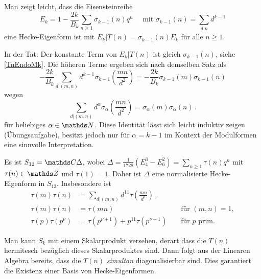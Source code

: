\begin{beme-list}
\item Man zeigt \glqq{}leicht\grqq{}, dass die Eisensteinreihe \[
E_k = 1 - \frac{2k}{B_k} \sum_{n \geq 1} \sigma_{k-1} (n) q^n \quad \text{ mit } \sigma_{k-1} (n) = \sum_{d \vert n} d^{k-1}
\]
eine Hecke-Eigenform ist mit $E_k | T(n) = \sigma_{k-1}(n) E_k$ für alle $n \geq 1$.

In der Tat: Der konstante Term von $E_k | T(n)$ ist gleich $\sigma_{k-1}(n)$, siehe \autoref{TnEndoMk}. Die höheren Terme ergeben sich nach demselben Satz als 
\[
- \frac{2k}{B_k} \sum_{d \vert (m,n)} d^{k-1} \sigma_{k-1} \left(\frac{mn}{d^2}\right) = - \frac{2k}{B_k} \sigma_{k-1}(m) \sigma_{k-1}(n)
\]
wegen
\[
\sum_{d \vert (m,n)} d^\alpha \sigma_\alpha \left(\frac{mn}{d^2}\right) = \sigma_\alpha(m) \sigma_\alpha(n)
\,.
\]
für beliebiges $\alpha \in \NN$. Diese Identität lässt sich leicht induktiv zeigen (Übungsaufgabe), besitzt jedoch nur für $\alpha = k - 1$ im Kontext der Modulformen eine sinnvolle Interpretation.
\item Es ist $S_{12} = \CC \Delta$, wobei $\Delta = \frac {1}{1728} (E_4^3 - E_6^2) = \sum_{n \geq 1} \tau(n) q^n$ mit $\tau (n) \in \ZZ$ und $\tau(1) = 1$. Daher ist $\Delta$ eine normalisierte Hecke-Eigenform in $S_{12}$. Insbesondere ist
\begin{align*}
\tau(m) \tau(n) &= \sum_{d \vert (m,n)} d^{11} \tau \left( \frac {mn}{d^2} \right)\,,\\
\tau(m) \tau(n) &= \tau(mn) &&\text{ für } (m,n) = 1,\\
\tau(p) \tau(p^\nu) &= \tau(p^{\nu+1}) + p^{11} \tau(p^{\nu-1}) &&\text{ für } p \text{ prim.}
\end{align*}
\item Man kann $S_k$ mit einem Skalarprodukt versehen, derart dass die $T(n)$ hermitesch bezüglich dieses Skalarproduktes sind. Dann folgt aus der Linearen Algebra bereits, dass die $T(n)$ \emph{simultan} diagonalisierbar sind. Dies garantiert die Existenz einer Basis von Hecke-Eigenformen.
\end{beme-list}
